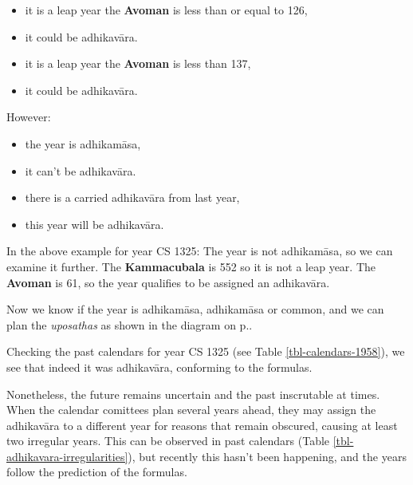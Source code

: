 \documentclass[11pt,oneside]{memoir-article}
\begin{document}
\begin{itemize}
\item {} it is a leap year  the \textbf{Avoman} is less than or equal to 126,
\item {} it could be adhikavāra.
\item {} it is  a leap year  the \textbf{Avoman} is less than 137,
\item {} it could be adhikavāra.
\end{itemize}


However:

\begin{itemize}
\item {} the year is adhikamāsa,
\item {} it can't be adhikavāra.
\item {} there is a carried adhikavāra from last year,
\item {} this year will be adhikavāra.
\end{itemize}

In the above example for year CS 1325: The year is not adhikamāsa, so we can
examine it further. The \textbf{Kammacubala} is 552 so it is not a leap year. The
\textbf{Avoman} is 61, so the year qualifies to be assigned an adhikavāra.

Now we know if the year is adhikamāsa, adhikamāsa or common, and we can plan the
\emph{uposathas} as shown in the diagram on
p.\pageref{dia-common-adhikamasa-adhikavara}.

Checking the past calendars for year CS 1325 (see Table
\ref{tbl-calendars-1958}), we see that indeed it was adhikavāra, conforming to
the formulas.

Nonetheless, the future remains uncertain and the past inscrutable at times.
When the calendar comittees plan several years ahead, they may assign the
adhikavāra to a different year for reasons that remain obscured, causing at
least two irregular years. This can be observed in past calendars (Table
\ref{tbl-adhikavara-irregularities}), but recently this hasn't been happening,
and the years follow the prediction of the formulas.
\end{document}

